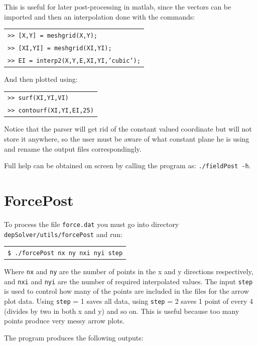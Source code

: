 \documentclass[12pt]{report}
\begin{document}
This is useful for later post-processing in matlab, since the vectors can be imported and then an interpolation done with the commands:

\begin{tabular}{l}
\texttt{>> [X,Y] = meshgrid(X,Y);}\\
\texttt{>> [XI,YI] = meshgrid(XI,YI);}\\
\texttt{>> EI = interp2(X,Y,E,XI,YI,'cubic');}
\end{tabular}

And then plotted using:

\begin{tabular}{l}
\texttt{>> surf(XI,YI,VI)}\\
\texttt{>> contourf(XI,YI,EI,25)}
\end{tabular}

Notice that the parser will get rid of the constant valued coordinate but will not store it anywhere, so the user must be aware of what constant plane he is using and rename the output files correspondingly.

Full help can be obtained on screen by calling the program as: \texttt{./fieldPost -h}.

\section{ForcePost}
To process the file \verb+force.dat+ you must go into directory \verb+depSolver/utils/forcePost+ and run:

\begin{tabular}{l}
\texttt{\$ ./forcePost nx ny nxi nyi step}
\end{tabular}

Where \verb+nx+ and \verb+ny+ are the number of points in the x and y directions respectively, and \verb+nxi+ and \verb+nyi+ are the number of required interpolated values. The input \verb+step+ is used to control how many of the points are included in the files for the arrow plot data. Using \verb+step+ = 1 saves all data, using \verb+step+ = 2 saves 1 point of every 4 (divides by two in both x and y) and so on. This is useful because too many points produce very messy arrow plots.

The program produces the following outputs:
\end{document}
